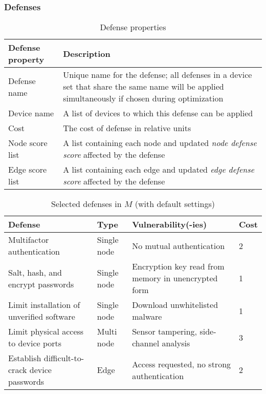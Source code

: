 \documentclass[10pt,journal,compsoc]{IEEEtran}
\begin{document}
\subsubsection{Defenses}
\label{subsubsection:user_input}

\begin {table}[h]
\caption {Defense properties}
\begin{tabular}{|m{1.5cm}|m{6.5cm}|}
\hline
\textbf{Defense property} & \textbf{Description} \\ \hline
Defense name & Unique name for the defense; all defenses in a device set that share the same name will be applied simultaneously if chosen during optimization \\ \hline
Device name & A list of devices to which this defense can be applied	\\ \hline
Cost & The cost of defense in relative units \\ \hline
Node score list & A list containing each node and updated \textit{node defense score} affected by the defense \\ \hline
Edge score list & A list containing each edge and updated \textit{edge defense score} affected by the defense \\ \hline
\end{tabular}
\label{fig:defense_properties}		
\end {table}

\begin {table}[h]
\caption {Selected defenses in $M$ (with default settings)}
\begin{tabular}{|m{3cm}|m{0.8cm}|m{2.9cm}|m{0.6cm}|}
\hline
\textbf{Defense} & \textbf{Type} & \textbf{Vulnerability(-ies)} & \textbf{Cost} \\ \hline
Multifactor authentication & Single node & No mutual authentication & 2 \\ \hline
Salt, hash, and encrypt passwords & Single node & Encryption key read from memory in unencrypted form & 1 \\ \hline
Limit installation of unverified software & Single node & Download unwhitelisted malware & 1 \\ \hline
Limit physical access to device ports & Multi node & Sensor tampering, side-channel analysis & 3 \\ \hline
Establish difficult-to-crack device passwords & Edge & Access requested, no strong authentication & 2 \\ \hline



\end{tabular}
\label{fig:selected_defenses}		
\end {table}
\end{document}
